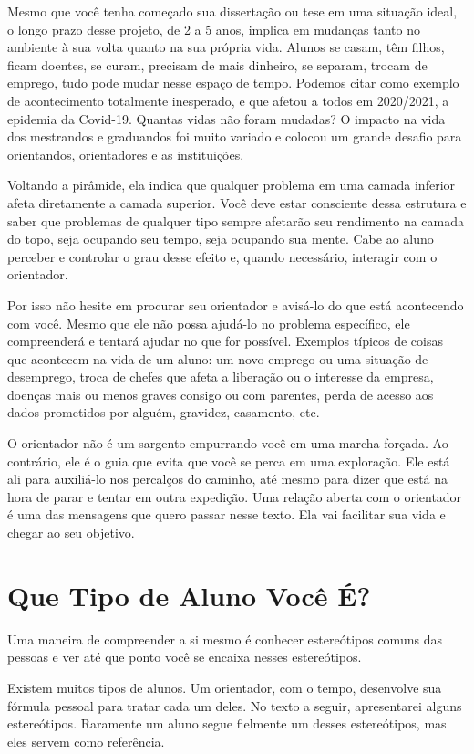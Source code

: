 Mesmo que você tenha começado sua dissertação ou tese em uma situação ideal, o longo prazo desse projeto, de 2 a 5 anos, implica em mudanças tanto no ambiente à sua volta quanto na sua própria vida. Alunos se casam, têm filhos, ficam doentes, se curam, precisam de mais dinheiro, se separam, trocam de emprego, tudo pode mudar nesse espaço de tempo.
Podemos citar como exemplo de acontecimento totalmente inesperado, e que afetou a todos em 2020/2021, a epidemia da Covid-19. Quantas vidas não foram mudadas? O impacto na vida dos mestrandos e graduandos foi muito variado e colocou um grande desafio para orientandos, orientadores e as instituições.

Voltando a pirâmide, ela indica que qualquer problema em uma camada inferior afeta diretamente a camada superior. Você deve estar consciente dessa estrutura e saber que problemas de qualquer tipo sempre afetarão seu rendimento na camada do topo, seja ocupando seu tempo, seja ocupando sua mente. Cabe ao aluno perceber e controlar o grau desse efeito e, quando necessário, interagir com o orientador.

Por isso não hesite em procurar seu orientador e avisá-lo do que está acontecendo com você. Mesmo que ele não possa ajudá-lo no problema específico, ele compreenderá e tentará ajudar no que for possível. 
Exemplos típicos de coisas que acontecem na vida de um aluno: um novo emprego ou uma situação de desemprego, troca de chefes que afeta a liberação ou o interesse da empresa, doenças mais ou menos graves consigo ou com parentes, perda de acesso aos dados prometidos por alguém, gravidez, casamento, etc.

O orientador não é um sargento empurrando você em uma marcha forçada. Ao contrário, ele é o guia que evita que você se perca em uma exploração. Ele está ali para auxiliá-lo nos percalços do caminho, até mesmo para dizer que está na hora de parar e tentar em outra expedição. 
Uma relação aberta com o orientador é uma das mensagens que quero passar nesse texto. Ela vai facilitar sua vida e chegar ao seu objetivo.

\section{Que Tipo de Aluno Você É?}

Uma maneira de compreender a si mesmo é conhecer estereótipos comuns das pessoas e ver até que ponto você se encaixa nesses estereótipos. 


Existem muitos tipos de alunos. Um orientador, com o tempo, desenvolve sua fórmula pessoal para tratar cada um deles. No texto a seguir, apresentarei alguns estereótipos. Raramente um aluno segue fielmente um desses estereótipos, mas eles servem como referência.


